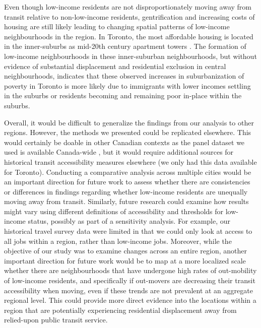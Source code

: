 Even though low-income residents are not disproportionately moving away from transit relative to non-low-income residents, gentrification and increasing costs of housing are still likely leading to changing spatial patterns of low-income neighbourhoods in the region. In Toronto, the most affordable housing is located in the inner-suburbs as mid-20th century apartment towers \cite{skaburskis_filtering_2014,august_gentrification_2018}. The formation of low-income neighbourhoods in these inner-suburban neighbourhoods, but without evidence of substantial displacement and residential exclusion in central neighbourhoods, indicates that these observed increases in suburbanization of poverty in Toronto is more likely due to immigrants with lower incomes settling in the suburbs or residents becoming and remaining poor in-place within the suburbs.

Overall, it would be difficult to generalize the findings from our analysis to other regions. However, the methods we presented could be replicated elsewhere. This would certainly be doable in other Canadian contexts as the panel dataset we used is available Canada-wide \cite{government_of_canada_longitudinal_2020}, but it would require additional sources for historical transit accessibility measures elsewhere (we only had this data available for Toronto). Conducting a comparative analysis across multiple cities would be an important direction for future work to assess whether there are consistencies or differences in findings regarding whether low-income residents are unequally moving away from transit. Similarly, future research could examine how results might vary using different definitions of accessibility and thresholds for low-income status, possibly as part of a sensitivity analysis. For example, our historical travel survey data were limited in that we could only look at access to all jobs within a region, rather than low-income jobs. Moreover, while the objective of our study was to examine changes across an entire region, another important direction for future work would be to map at a more localized scale whether there are neighbourhoods that have undergone high rates of out-mobility of low-income residents, and specifically if out-movers are decreasing their transit accessibility when moving, even if these trends are not prevalent at an aggregate regional level. This could provide more direct evidence into the locations within a region that are potentially experiencing residential displacement away from relied-upon public transit service.